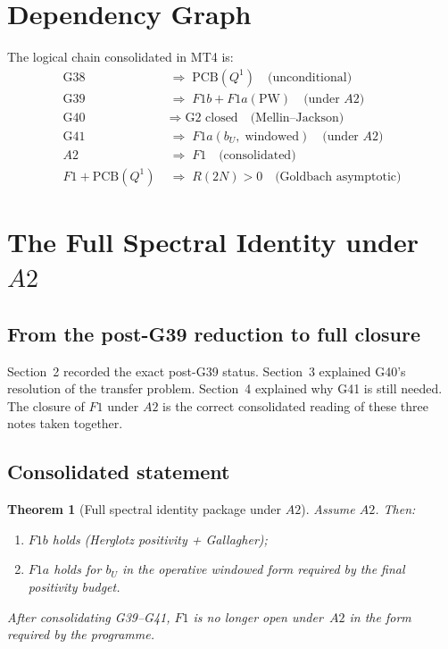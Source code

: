 \documentclass[11pt,a4paper]{article}
\newtheorem{theorem}{Theorem}[section]
\begin{document}
\section{Dependency Graph}

The logical chain consolidated in MT4 is:
\begin{align*}
\text{G38} &\;\Longrightarrow\; \text{PCB}(Q^1) \quad\text{(unconditional)} \\
\text{G39} &\;\Longrightarrow\; F1b + F1a(\text{PW}) \quad\text{(under } A2\text{)} \\
\text{G40} &\;\Longrightarrow\; \text{G2 closed} \quad\text{(Mellin--Jackson)} \\
\text{G41} &\;\Longrightarrow\; F1a(b_U,\;\text{windowed}) \quad\text{(under } A2\text{)} \\
A2 &\;\Longrightarrow\; F1 \quad\text{(consolidated)} \\
F1 + \text{PCB}(Q^1) &\;\Longrightarrow\; R(2N)>0 \quad\text{(Goldbach asymptotic)}
\end{align*}

\section{The Full Spectral Identity under $A2$}

\subsection{From the post-G39 reduction to full closure}

Section~2 recorded the exact post-G39 status.  Section~3 explained G40's resolution of the transfer problem.  Section~4 explained why G41 is still needed.  The closure of $F1$ under $A2$ is the correct consolidated reading of these three notes taken together.

\subsection{Consolidated statement}

\begin{theorem}[Full spectral identity package under $A2$]
\label{thm:full-F1}
Assume $A2$.  Then:
\begin{enumerate}[nosep]
    \item $F1b$ holds (Herglotz positivity + Gallagher);
    \item $F1a$ holds for $b_U$ in the operative windowed form required by the final positivity budget.
\end{enumerate}
After consolidating G39--G41, $F1$ is no longer open under~$A2$ in the form required by the programme.
\end{theorem}
\end{document}
